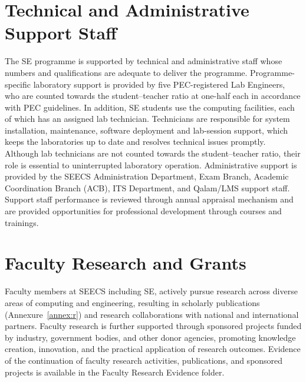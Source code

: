 \section{Technical and Administrative Support Staff}

The SE programme is supported by technical and administrative staff
whose numbers and qualifications are adequate to deliver the programme. Programme-specific laboratory support is provided by five PEC-registered Lab Engineers, who are counted towards the student--teacher ratio at one-half each
in accordance with PEC guidelines. In addition,
SE students use the computing facilities, each of which has an assigned lab technician. Technicians are responsible for system installation,
maintenance, software deployment and lab-session support, which keeps the
laboratories up to date and resolves technical issues promptly. Although
lab technicians are not counted towards the student--teacher ratio, their
role is essential to uninterrupted laboratory operation. Administrative
support is provided by the SEECS Administration Department, Exam Branch,
Academic Coordination Branch (ACB), ITS Department, and Qalam/LMS support staff. Support staff
performance is reviewed through annual appraisal mechanism and are provided opportunities for professional development through courses and trainings.

\section{Faculty Research and Grants}
\label{researchfunding}
Faculty members at SEECS including SE, actively pursue research across diverse areas of computing and engineering, resulting in scholarly publications (Annexure~\ref{annex:r}) and research collaborations with national and international partners. Faculty research is further supported through sponsored projects funded by industry, government bodies, and other donor agencies, promoting knowledge creation, innovation, and the practical application of research outcomes. Evidence of the continuation of faculty research activities, publications, and sponsored projects is available in the Faculty Research Evidence folder. 

